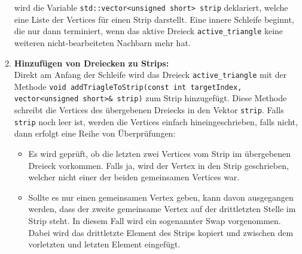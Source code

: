 \begin{enumerate}
	wird die Variable \lstinline{std::vector<unsigned short> strip} deklariert, welche eine
	Liste der Vertices für einen Strip darstellt. Eine innere Schleife beginnt,
	die nur dann terminiert, wenn das aktive Dreieck \lstinline{active_triangle} keine
	weiteren nicht-bearbeiteten Nachbarn mehr hat. 
	\\
	\item \textbf{Hinzufügen von Dreiecken zu Strips:} 
	\\
	Direkt am Anfang der Schleife wird das Dreieck \lstinline{active_triangle} mit der
	Methode \lstinline{void addTriagleToStrip(const int targetIndex, vector<unsigned short>& strip)} 
	zum \break Strip hinzugefügt. Diese Methode schreibt die Vertices
	des übergebenen Dreiecks in den Vektor \lstinline{strip}. Falls \lstinline{strip} noch leer ist,
	werden die Vertices einfach hineingeschrieben, falls nicht, dann erfolgt
	eine Reihe von Überprüfungen:
	\\
	\begin{itemize}
	\item Es wird geprüft, ob die letzten zwei Vertices vom Strip im übergebenen
	Dreieck vorkommen. Falls ja, wird der Vertex in den Strip geschrieben,
	welcher nicht einer der beiden gemeinsamen Vertices war. 
	\\
	\item Sollte es nur einen gemeinsamen Vertex geben, kann davon ausgegangen
	werden, dass der zweite gemeinsame Vertex auf der drittletzten Stelle im
	Strip steht. In diesem Fall wird ein sogenannter Swap vorgenommen. Dabei wird das
	drittletzte Element des Strips kopiert und zwischen dem vorletzten und
	letzten Element eingefügt.
	\end{itemize} 
	

\end{enumerate}
